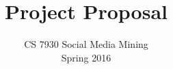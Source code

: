 \documentclass{sig-alternate-05-2015}
\begin{document}



%

\title{Project Proposal}
\subtitle{CS 7930 Social Media Mining\\
Spring 2016}
%
%
%
%
%
\end{document}
